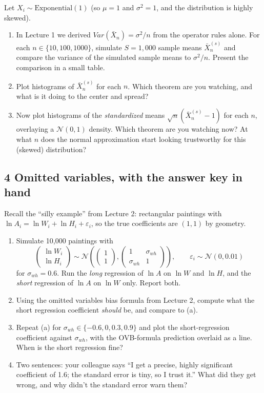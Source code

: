 \documentclass[11pt]{article}
\begin{document}
Let $X_{i} \sim \text{Exponential}(1)$ (so $\mu = 1$ and $\sigma^{2} = 1$, and the
distribution is highly skewed).
\begin{enumerate}[label=(\alph*)]
\item In Lecture 1 we derived $Var\left(\bar{X}_{n}\right) = \sigma^{2}/n$ from the
operator rules alone. For each $n \in \{10, 100, 1000\}$, simulate $S = 1{,}000$ sample
means $\bar{X}_{n}^{(s)}$ and compare the variance of the simulated sample means to
$\sigma^{2}/n$. Present the comparison in a small table.
\item Plot histograms of $\bar{X}_{n}^{(s)}$ for each $n$. Which theorem are you watching,
and what is it doing to the center and spread?
\item Now plot histograms of the \emph{standardized} means
$\sqrt{n}\left(\bar{X}_{n}^{(s)} - 1\right)$ for each $n$, overlaying a
$\mathcal{N}\left(0, 1\right)$ density. Which theorem are you watching now? At what $n$
does the normal approximation start looking trustworthy for this (skewed) distribution?
\end{enumerate}

\subsection*{4 Omitted variables, with the answer key in hand}

Recall the ``silly example'' from Lecture 2: rectangular paintings with
$\ln A_{i} = \ln W_{i} + \ln H_{i} + \varepsilon_{i}$, so the true coefficients are
$\left(1, 1\right)$ by geometry.
\begin{enumerate}[label=(\alph*)]
\item Simulate 10,000 paintings with
\[
\left(\begin{array}{c} \ln W_{i} \\ \ln H_{i} \end{array}\right) \sim
\mathcal{N}\left(\left(\begin{array}{c} 1 \\ 1 \end{array}\right),
\left(\begin{array}{cc} 1 & \sigma_{wh} \\ \sigma_{wh} & 1 \end{array}\right)\right),
\qquad \varepsilon_{i} \sim \mathcal{N}\left(0, 0.01\right)
\]
for $\sigma_{wh} = 0.6$. Run the \emph{long} regression of $\ln A$ on $\ln W$ and
$\ln H$, and the \emph{short} regression of $\ln A$ on $\ln W$ only. Report both.
\item Using the omitted variables bias formula from Lecture 2, compute what the short
regression coefficient \emph{should} be, and compare to (a).
\item Repeat (a) for $\sigma_{wh} \in \{-0.6, 0, 0.3, 0.9\}$ and plot the short-regression
coefficient against $\sigma_{wh}$, with the OVB-formula prediction overlaid as a line.
When is the short regression fine?
\item Two sentences: your colleague says ``I get a precise, highly significant
coefficient of 1.6; the standard error is tiny, so I trust it.'' What did they get
wrong, and why didn't the standard error warn them?
\end{enumerate}
\end{document}
